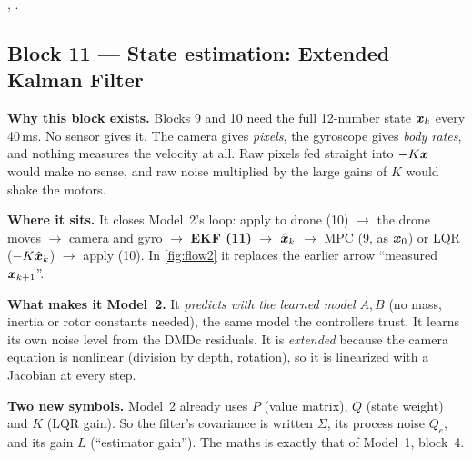 \begin{codebox}
\intoy {}, .
\end{codebox}

\subsection{Block 11 --- State estimation: Extended Kalman Filter}
\label{sec:m2b11}

\begin{keybox}
\textbf{Why this block exists.} Blocks 9 and 10 need the full 12-number state $\bm{x}_k$ every 40\,ms. No sensor gives it.
The camera gives \emph{pixels}, the gyroscope gives \emph{body rates}, and nothing measures the velocity at all. Raw
pixels fed straight into $-K\bm{x}$ would make no sense, and raw noise multiplied by the large gains of $K$ would shake
the motors.

\textbf{Where it sits.} It closes Model~2's loop: apply to drone (10) $\rightarrow$ the drone moves $\rightarrow$
camera and gyro $\rightarrow$ \textbf{EKF (11)} $\rightarrow$ $\hat{\bm x}_k$ $\rightarrow$ MPC (9, as $\bm{x}_0$) or LQR ($-K\hat{\bm x}_k$)
$\rightarrow$ apply (10). In \cref{fig:flow2} it replaces the earlier arrow ``measured $\bm{x}_{k+1}$''.

\textbf{What makes it Model~2.} It \emph{predicts with the learned model} $A,B$ (no mass, inertia or rotor constants
needed), the same model the controllers trust. It learns its own noise level from the DMDc residuals. It is
\emph{extended} because the camera equation is nonlinear (division by depth, rotation), so it is linearized with a
Jacobian at every step.
\end{keybox}

\textbf{Two new symbols.} Model~2 already uses $P$ (value matrix), $Q$ (state weight) and $K$ (LQR gain). So the
filter's covariance is written $\Sigma$, its process noise $Q_e$, and its gain $L$ (``estimator gain''). The maths is
exactly that of Model~1, block~4.

